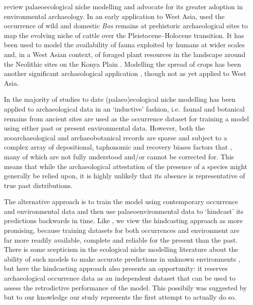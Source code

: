 \documentclass[
  authoryear,
  preprint]{elsarticle}
\begin{document}
\citet{FranklinEtAl2015} review palaeoecological niche modelling and
advocate for its greater adoption in environmental archaeology. In an
early application to West Asia, \citet{ConollyEtAl2012} used the
occurrence of wild and domestic \emph{Bos} remains at prehistoric
archaeological sites to map the evolving niche of cattle over the
Pleistocene--Holocene transition. It has been used to model the
availability of fauna exploited by humans at wider scales
\citep[e.g.][]{deAndresHerreroEtAl2018, YaworskyEtAl2023} and, in a West
Asian context, of foraged plant resources in the landscape around the
Neolithic sites on the Konya Plain \citep{CollinsEtAl2018}. Modelling
the spread of crops has been another significant archaeological
application \citep[e.g.][]{KrzyzanskaEtAl2022, Krzyzanska2023}, though
not as yet applied to West Asia.

In the majority of studies to date (palaeo)ecological niche modelling
has been applied to archaeological data in an `inductive' fashion,
i.e.~faunal and botanical remains from ancient sites are used as the
occurrence dataset for training a model using either past or present
environmental data. However, both the zooarchaeological and
archaeobotanical records are sparse and subject to a complex array of
depositional, taphonomic and recovery biases factors that , many of
which are not fully understood and/or cannot be corrected for. This
means that while the archaeological attestation of the presence of a
species might generally be relied upon, it is highly unlikely that its
absence is representative of true past distributions.

The alternative approach is to train the model using contemporary
occurrence and environmental data and then use palaeoenvironmental data
to `hindcast' its predictions backwards in time. Like
\citet{FranklinEtAl2015}, we view the hindcasting approach as more
promising, because training datasets for both occurrences and
environment are far more readily available, complete and reliable for
the present than the past. There is some scepticism in the ecological
niche modelling literature about the ability of such models to make
accurate predictions in unknown environments \citep[like the
past,][]{FranklinEtAl2015}, but here the hindcasting approach also
presents an opportunity: it reserves archaeological occurrence data as
an independent dataset that can be used to assess the retrodictive
performance of the model. This possibily was suggested by
\citet{FranklinEtAl2015} but to our knowledge our study represents the
first attempt to actually do so.
\end{document}
